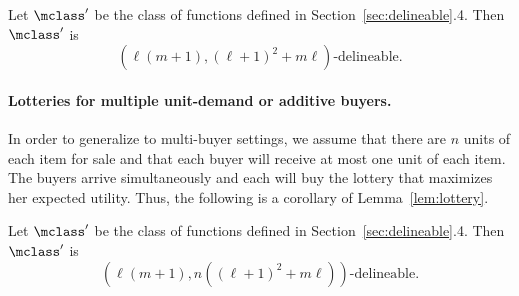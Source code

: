 \begin{theorem}
Let $\mclass'$ be the class of functions defined in Section~\ref{sec:delineable}.4. Then $\mclass'$ is \[\left(\ell\left(m+1\right), \left(\ell+1\right)^2 + m\ell\right)\text{-delineable}.\]
\end{theorem}

\paragraph{Lotteries for multiple unit-demand or additive buyers.} In order to generalize to multi-buyer settings, we assume that there are $n$ units of each item for sale and that each buyer will receive at most one unit of each item. The buyers arrive simultaneously and each will buy the lottery that maximizes her expected utility. Thus, the following is a corollary of Lemma~\ref{lem:lottery}.

\begin{theorem}
Let $\mclass'$ be the class of functions defined in Section~\ref{sec:delineable}.4. Then $\mclass'$ is \[\left(\ell\left(m+1\right), n\left(\left(\ell+1\right)^2 + m\ell\right)\right)\text{-delineable.}\]
\end{theorem}
